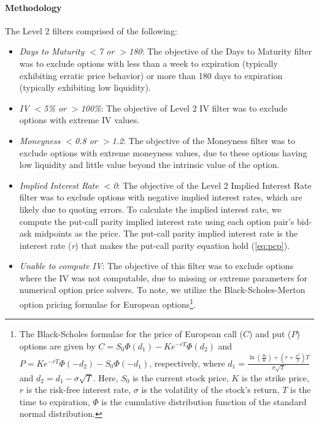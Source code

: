 \paragraph{Methodology}

The Level 2 filters comprised of the following: 
\begin{itemize}
  \item \textit{Days to Maturity $<$7 or $>$180}: The objective of the Days to Maturity filter was to exclude options with less than a week to expiration (typically exhibiting erratic price behavior) or more than 180 days to expiration (typically exhibiting low liquidity).
  \item \textit{IV $<$5\% or $>$100\%}: The objective of Level 2 IV filter was to exclude options with extreme IV values.
  \item \textit{Moneyness $<$0.8 or $>$1.2}: The objective of the Moneyness filter was to exclude options with extreme moneyness values, due to these options having low liquidity and little value beyond the intrinsic value of the option.
  \item \textit{Implied Interest Rate $<$0}: The objective of the Level 2 Implied Interest Rate filter was to exclude options with negative implied interest rates, which are likely due to quoting errors. To calculate the implied interest rate, we compute the put-call parity implied interest rate using each option pair's bid-ask midpoints as the price. The put-call parity implied interest rate is the interest rate (\textit{r}) that makes the put-call parity equation hold (\autoref{eq:pcp}).
  \item \textit{Unable to compute IV}: The objective of this filter was to exclude options where the IV was not computable, due to missing or extreme parameters for numerical option price solvers. To note, we utilize the Black-Scholes-Merton option pricing formulae for European options\footnote{The Black-Scholes formulae for the price of European call ($C$) and put ($P$) options are given by $C = S_0 \Phi(d_1) - K e^{-rT} \Phi(d_2)$ and $P = K e^{-rT} \Phi(-d_2) - S_0 \Phi(-d_1)$, respectively, where $d_1 = \frac{\ln(\frac{S_0}{K}) + (r + \frac{\sigma^2}{2})T}{\sigma\sqrt{T}}$ and $d_2 = d_1 - \sigma\sqrt{T}$. Here, $S_0$ is the current stock price, $K$ is the strike price, $r$ is the risk-free interest rate, $\sigma$ is the volatility of the stock's return, $T$ is the time to expiration, $\Phi$ is the cumulative distribution function of the standard normal distribution.
  }.
\end{itemize}


